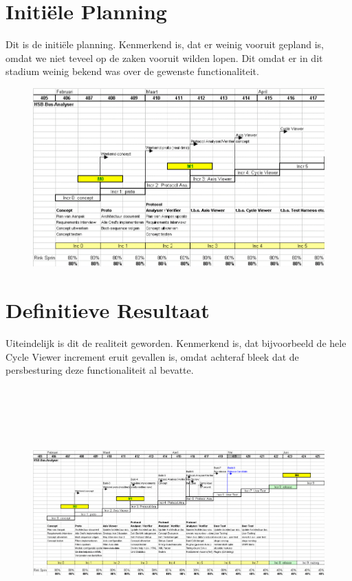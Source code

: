 \begin{landscape}

\section{Initi\"ele Planning}

Dit is de initi\"ele planning. Kenmerkend is, dat er weinig vooruit gepland is, omdat we niet teveel op de zaken vooruit wilden lopen. Dit omdat er in dit stadium weinig bekend was over de gewenste functionaliteit.

\begin{figure}[h]
\includegraphics[width=15cm]{initiele_planning.png}
\end{figure}

\newpage

\section{Definitieve Resultaat}

Uiteindelijk is dit de realiteit geworden. Kenmerkend is, dat bijvoorbeeld de hele Cycle Viewer increment eruit gevallen is, omdat achteraf bleek dat de persbesturing deze functionaliteit al bevatte.

\begin{figure}[h]
\includegraphics[width=20.9cm,height=9.7cm]{def_res.png}
\end{figure}

\end{landscape}

